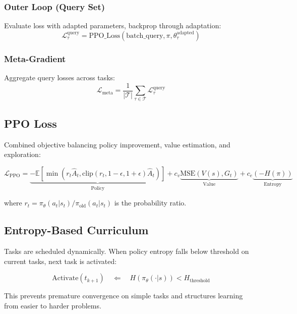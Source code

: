 \documentclass[11pt,a4paper]{article}
\begin{document}
\subsubsection{Outer Loop (Query Set)}
Evaluate loss with adapted parameters, backprop through adaptation:
\begin{equation}
\mathcal{L}_\tau^{\text{query}} = \text{PPO\_Loss}(\text{batch\_query}, \pi, \theta_\tau^{\text{adapted}})
\end{equation}

\subsubsection{Meta-Gradient}
Aggregate query losses across tasks:
\begin{equation}
\mathcal{L}_{\text{meta}} = \frac{1}{|\mathcal{T}|} \sum_{\tau \in \mathcal{T}} \mathcal{L}_\tau^{\text{query}}
\end{equation}

\subsection{PPO Loss}

Combined objective balancing policy improvement, value estimation, and exploration:

\begin{equation}
\mathcal{L}_{\text{PPO}} = \underbrace{-\mathbb{E}\left[\min\left(r_t \hat{A}_t, \text{clip}(r_t, 1-\epsilon, 1+\epsilon)\hat{A}_t\right)\right]}_{\text{Policy}} + c_v \underbrace{\text{MSE}(V(s), G_t)}_{\text{Value}} + c_e \underbrace{(-H(\pi))}_{\text{Entropy}}
\end{equation}

\noindent
where $r_t = \pi_\theta(a_t|s_t) / \pi_\text{old}(a_t|s_t)$ is the probability ratio.

\subsection{Entropy-Based Curriculum}

Tasks are scheduled dynamically. When policy entropy falls below threshold on current tasks, next task is activated:

\begin{equation}
\text{Activate}(t_{k+1}) \quad \Leftarrow \quad H(\pi_\theta(\cdot|s)) < H_{\text{threshold}}
\end{equation}

This prevents premature convergence on simple tasks and structures learning from easier to harder problems.
\end{document}
